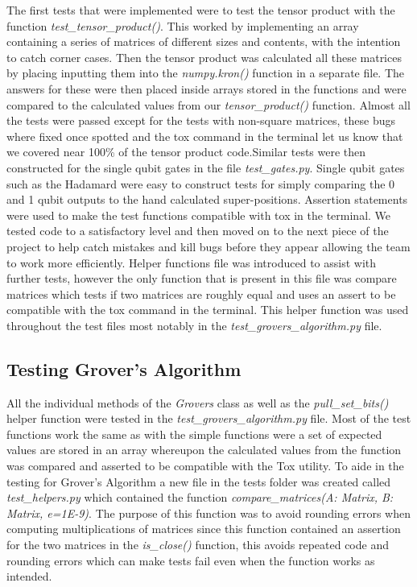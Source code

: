 \documentclass{article}
\begin{document}
 The first tests that were implemented were to test the tensor product with the function \textit{test\_tensor\_product()}. This worked by implementing an array containing a series of matrices of different sizes and contents, with the intention to catch corner cases. Then the tensor product was calculated all these matrices by placing inputting them into the \textit{numpy.kron()} function in a separate file. The answers for these were then placed inside arrays stored in the functions and were compared to the calculated values from our \textit{tensor\_product()} function. Almost all the tests were passed except for the tests with non-square matrices, these bugs where fixed once spotted and the tox command in the terminal let us know that we covered near 100\% of the tensor product code.Similar tests were then constructed for the single qubit gates in the file \textit{test\_gates.py}. Single qubit gates such as the Hadamard were easy to construct tests for simply comparing the 0 and 1 qubit outputs to the hand calculated super-positions. Assertion statements were used to make the test functions compatible with tox in the terminal. We tested code to a satisfactory level and then moved on to the next piece of the project to help catch mistakes and kill bugs before they appear allowing the team to work more efficiently. Helper functions file was introduced to assist with further tests, however the only function that is present in this file was compare matrices which tests if two matrices are roughly equal and uses an assert to be compatible with the tox command in the terminal.  This helper function was used throughout the test files most notably in the \textit{test\_grovers\_algorithm.py} file. 
\subsection{Testing Grover's Algorithm}

All the individual methods of the \textit{Grovers} class as well as the \textit{pull\_set\_bits()} helper function were tested in the \textit{test\_grovers\_algorithm.py} file. Most of the test functions work the same as with the simple functions were a set of expected values are stored in an array whereupon the calculated values from the function was compared and asserted to be compatible with the Tox utility. To aide in the testing for Grover's Algorithm a new file in the tests folder was created called  \textit{test\_helpers.py} which contained the function \textit{compare\_matrices(A: Matrix, B: Matrix, e=1E-9)}. The purpose of this function was to avoid rounding errors when computing multiplications of matrices since this function contained an assertion for the two matrices in the \textit{is\_close()} function, this avoids repeated code and rounding errors which can make tests fail even when the function works as intended.
\end{document}
